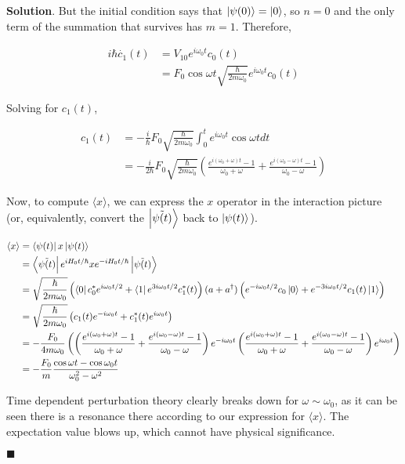 \documentclass[12pt]{article}
\theoremstyle{definition}
\newenvironment{s}{%
        \begin{trivlist} \item \textbf{Solution}. }{%
            \hspace*{\fill} $\blacksquare$\end{trivlist}}%
\begin{document}
{\begin{s}
But the initial condition says that $\ket{\psi(0)} = \ket{0}$, so $n=0$ and the only term of the summation that survives has $m=1$. Therefore,

\begin{align*}
i\hbar\dot{c_{1}}(t) &= V_{10}e^{i\omega_{0}t}c_{0}(t)\\
&= F_{0}\cos\omega t\sqrt{\frac{\hbar}{2m\omega_{0}}}e^{i\omega_{0}t}c_{0}(t)
\end{align*}

Solving for $c_{1}(t)$, 

\begin{align*}
c_{1}(t) &= -\frac{i}{\hbar}F_{0}\sqrt{\frac{\hbar}{2m\omega_{0}}}\int_{0}^{t}e^{i\omega_{0}t}\cos\omega t dt\\
&= -\frac{i}{2\hbar}F_{0}\sqrt{\frac{\hbar}{2m\omega_{0}}}\left(\frac{e^{i(\omega_{0}+\omega)t}-1}{\omega_{0}+\omega}+\frac{e^{i(\omega_{0}-\omega)t}-1}{\omega_{0}-\omega}\right)
\end{align*}

Now, to compute $\langle x \rangle$, we can express the $x$ operator in the interaction picture (or, equivalently, convert the $\ket{\tilde{\psi(t)}}$ back to $\ket{\psi(t)}$).

\begin{align*}
\langle x \rangle &= \bra{\psi(t)} x \ket{\psi(t)} \\
&= \bra{\tilde{\psi(t)}}e^{iH_{0}t/\hbar} x e^{-iH_{0}t/\hbar}\ket{\tilde{\psi(t)}}\\
&= \sqrt{\frac{\hbar}{2m\omega_{0}}}\left(\bra{0}c_{0}^{*}e^{i\omega_{0}t/2} + \bra{1}e^{3i\omega_{0}t/2}c_{1}^{*}(t)\right)(a+a^{\dagger})\left(e^{-i\omega_{0}t/2}c_{0}\ket{0} + e^{-3i\omega_{0}t/2}c_{1}(t)\ket{1}\right)\\
&= \sqrt{\frac{\hbar}{2m\omega_{0}}}\left(c_{1}(t)e^{-i\omega_{0}t} + c_{1}^{*}(t)e^{i\omega_{0}t}\right)\\
&= -\frac{F_{0}}{4m\omega_{0}}\left(\left(\frac{e^{i(\omega_{0}+\omega)t}-1}{\omega_{0}+\omega}+\frac{e^{i(\omega_{0}-\omega)t}-1}{\omega_{0}-\omega}\right)e^{-i\omega_{0}t}  \left(\frac{e^{i(\omega_{0}+\omega)t}-1}{\omega_{0}+\omega}+\frac{e^{i(\omega_{0}-\omega)t}-1}{\omega_{0}-\omega}\right)e^{i\omega_{0}t}\right)\\
&= -\frac{F_{0}}{m}\frac{\cos\omega t - \cos\omega_{0}t}{\omega_{0}^{2}-\omega^{2}}
\end{align*}

Time dependent perturbation theory clearly breaks down for $\omega \sim \omega_{0}$, as it can be seen there is a resonance there according to our expression for $\langle x\rangle$. The expectation value blows up, which cannot have physical significance.


\end{s}}
\end{document}
